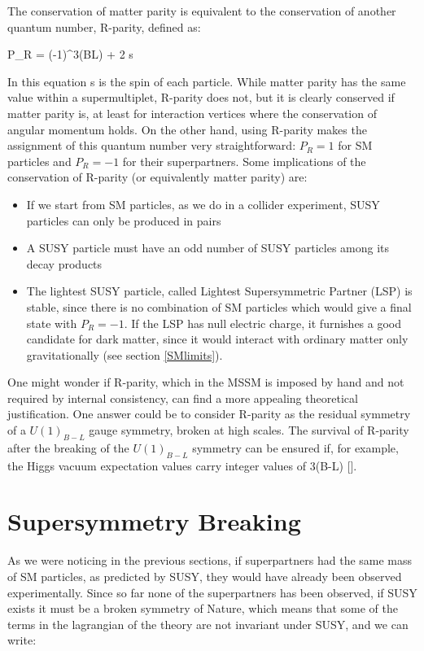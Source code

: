 The conservation of matter parity is equivalent to the conservation of another quantum number, R-parity, defined as:

\beq
P_R = (-1)^{3(BL) + 2 s}
\label{eq:defRparity}
\eeq

In this equation s is the spin of each particle. While matter parity has the same value within a supermultiplet, R-parity does not, but it is clearly conserved if matter parity is, at least for interaction vertices where the conservation of angular momentum holds. On the other hand, using R-parity makes the assignment of this quantum number very straightforward: $P_R =1$ for SM particles and $P_R = -1$ for their superpartners.
Some implications of the conservation of R-parity (or equivalently matter parity) are:
\begin{itemize}
\item If we start from SM particles, as we do in a collider experiment, SUSY particles can only be produced in pairs
\item A SUSY particle must have an odd number of SUSY particles among its decay products 
\item The lightest SUSY particle, called Lightest Supersymmetric Partner (LSP) is stable, since there is no combination of SM particles which would give a final state with $P_R = -1$. If the LSP has null electric charge, it furnishes a good candidate for dark matter, since it would interact with ordinary matter only gravitationally (see section \ref{SMlimits}). 
\end{itemize}

One might wonder if R-parity, which in the MSSM is imposed by hand and not required by internal consistency, can find a more appealing theoretical justification. One answer could be to consider R-parity as the residual symmetry of a $U(1)_{B-L}$ gauge symmetry, broken at high scales. The survival of R-parity after the breaking of the $U(1)_{B-L}$ symmetry can be ensured if, for example, the Higgs vacuum expectation values carry integer values of 3(B-L) [\cite{martin:Rparity}].


\section{Supersymmetry Breaking}
As we were noticing in the previous sections, if superpartners had the same mass of SM particles, as predicted by SUSY, they would have already been observed experimentally. Since so far none of the superpartners has been observed, if SUSY exists it must be a broken symmetry of Nature, which means that some of the terms in the lagrangian of the theory are not invariant under SUSY, and we can write:

